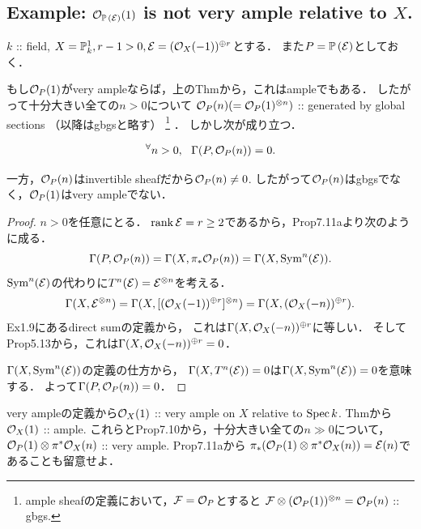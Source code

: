 \documentclass[a4paper]{jsarticle}
\newcommand{\pbundle}{\mathbb{P}\,}
\begin{document}
    \subsection{Example: $\shO_{\pbundle(\shE)}(1)$ is not very ample relative to $X$.}
    $k$ :: field, $X=\mathbb{P}^1_k, r-1>0, \mathcal{E}=(\mathcal{O}_X(-1))^{\oplus r}$とする．
    また$P=\pbundle(\shE)$としておく．

    もし$\mathcal{O}_P(1)$がvery ampleならば，上のThmから，これはampleでもある．
    したがって十分大きい全ての$n>0$について
    $\mathcal{O}_P(n)(=\mathcal{O}_P(1)^{\otimes n})$ :: generated by global sections （以降はgbgsと略す）
    \footnote
    {
        ample sheafの定義において，$\mathcal{F}=\mathcal{O}_P$とすると
        $\mathcal{F} \otimes (\mathcal{O}_P(1))^{\otimes n}=\mathcal{O}_P(n)$ :: gbgs.
    }
    ．
    しかし次が成り立つ．
    \begin{Claim}
        \[ {}^{\forall} n>0,~~ \Gamma(P, \mathcal{O}_P(n))=0. \]
    \end{Claim}
    一方，$\mathcal{O}_P(n)$はinvertible sheafだから$\mathcal{O}_P(n) \neq 0$.
    したがって$\mathcal{O}_P(n)$はgbgsでなく，$\mathcal{O}_P(1)$はvery ampleでない．
    \begin{proof}
        $n>0$を任意にとる．
        $\operatorname{rank} \mathcal{E}=r \geq 2$であるから，Prop7.11aより次のように成る．
        \[ \Gamma(P, \mathcal{O}_P(n))=\Gamma(X, \pi_*\mathcal{O}_P(n))=\Gamma(X, \operatorname{Sym}^n(\mathcal{E})). \]
        $\operatorname{Sym}^n(\mathcal{E})$の代わりに$T^n(\mathcal{E})=\mathcal{E}^{\otimes n}$を考える．
        \[
            \Gamma(X, \mathcal{E}^{\otimes n})
            =\Gamma(X, [(\mathcal{O}_X(-1))^{\oplus r}]^{\otimes n})
            =\Gamma(X, (\mathcal{O}_X(-n))^{\oplus r}).
        \]
        Ex1.9にあるdirect sumの定義から，
        これは$\Gamma(X, \mathcal{O}_X(-n))^{\oplus r}$に等しい．
        そしてProp5.13から，これは$\Gamma(X, \mathcal{O}_X(-n))^{\oplus r}=0$．

        $\Gamma(X, \operatorname{Sym}^n(\mathcal{E}))$の定義の仕方から，
        $\Gamma(X, T^n(\mathcal{E}))=0$は$\Gamma(X, \operatorname{Sym}^n(\mathcal{E}))=0$を意味する．
        よって$\Gamma(P, \mathcal{O}_P(n))=0$．
    \end{proof}

    \begin{Remark}
        very ampleの定義から$\mathcal{O}_X(1)$ :: very ample on $X$ relative to $\operatorname{Spec} k$.
        Thmから$\mathcal{O}_X(1)$ :: ample.
        これらとProp7.10から，十分大きい全ての$n \gg 0$について，
        $\mathcal{O}_P(1) \otimes \pi^* \mathcal{O}_X(n)$ :: very ample.
        Prop7.11aから
        $\pi_*(\mathcal{O}_P(1) \otimes \pi^* \mathcal{O}_X(n))=\mathcal{E}(n)$であることも留意せよ．
    \end{Remark}
\end{document}
